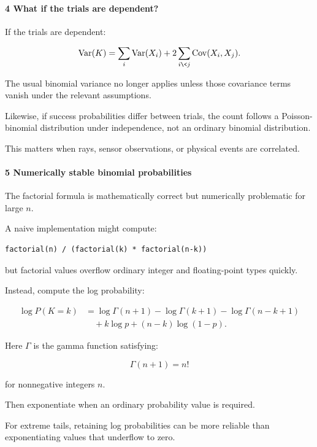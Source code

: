 \paragraph{4 What if the trials are dependent?}\label{what-if-the-trials-are-dependent}

If the trials are dependent:

\[
 \operatorname{Var}(K)= \sum_i\operatorname{Var}(X_i) + 2\sum_{i\<j}\operatorname{Cov}(X_i,X_j).
\]

The usual binomial variance no longer applies unless those covariance terms vanish under the relevant assumptions.

Likewise, if success probabilities differ between trials, the count follows a Poisson-binomial distribution under independence, not an ordinary binomial distribution.

This matters when rays, sensor observations, or physical events are correlated.

\paragraph{5 Numerically stable binomial probabilities}\label{numerically-stable-binomial-probabilities}

The factorial formula is mathematically correct but numerically problematic for large \(n\).

A naive implementation might compute:

\begin{verbatim}
factorial(n) / (factorial(k) * factorial(n-k))
\end{verbatim}

but factorial values overflow ordinary integer and floating-point types quickly.

Instead, compute the log probability:

\[
 \begin{aligned} \log P(K=k) &= \log\Gamma(n+1) -\log\Gamma(k+1) -\log\Gamma(n-k+1)\\ &\quad+k\log p+(n-k)\log(1-p). \end{aligned}
\]

Here \(\Gamma\) is the gamma function satisfying:

\[
 \Gamma(n+1)=n!
\]

for nonnegative integers \(n\).

Then exponentiate when an ordinary probability value is required.

For extreme tails, retaining log probabilities can be more reliable than exponentiating values that underflow to zero.

